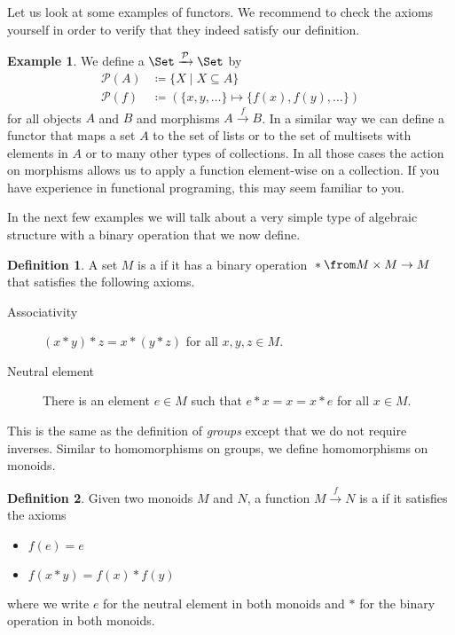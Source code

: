 \documentclass{article}
\theoremstyle{definition}
\newtheorem{definition}{Definition}
\newtheorem{example}{Example}
\begin{document}
Let us look at some examples of functors.
We recommend to check the axioms yourself in order to verify that they indeed satisfy our definition.

\begin{example}
  We define a  $\Set \xrightarrow{\mathcal{P}} \Set$ by
  \begin{align*}
    \mathcal{P}(A) &\coloneqq \{ X \mid X \subseteq A \} \\
    \mathcal{P}(f) &\coloneqq (\{x, y, \ldots\} \mapsto \{f(x), f(y), \ldots\})
  \end{align*}
  for all objects $A$ and $B$ and morphisms $A \xrightarrow{f} B$.
  In a similar way we can define a functor that maps a set $A$ to the set of lists or to the set of multisets with elements in $A$ or to many other types of collections.
  In all those cases the action on morphisms allows us to apply a function element-wise on a collection.
  If you have experience in functional programing, this may seem familiar to you.
\end{example}

In the next few examples we will talk about a very simple type of algebraic structure with a binary operation that we now define.

\begin{definition}
  A set $M$ is a  if it has a binary operation ${}*{} \from M \times M \to M$ that satisfies the following axioms.
  \begin{description}
    \item [Associativity] $(x * y) * z = x * (y * z)$ for all $x, y, z \in M$.
    \item [Neutral element] There is an element $e \in M$ such that $e * x = x = x * e$ for all $x \in M$.
  \end{description}
\end{definition}

This is the same as the definition of \emph{groups} except that we do not require inverses.
Similar to homomorphisms on groups, we define homomorphisms on monoids.

\begin{definition}
  Given two monoids $M$ and $N$, a function $M \xrightarrow{f} N$ is a  if it satisfies the axioms
  \begin{itemize}
    \item $f(e) = e$
    \item $f(x * y) = f(x) * f(y)$
  \end{itemize}
  where we write $e$ for the neutral element in both monoids and $*$ for the binary operation in both monoids.
\end{definition}
\end{document}
